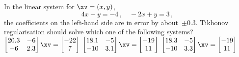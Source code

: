\begin{activity}
In the linear system for \(\xv=(x,y)\),
\begin{equation*}
4x-y=-4\,,\quad-2x+y=3\,,
\end{equation*}
the coefficients on the left-hand side are in error by about~\(\pm0.3\).  
Tikhonov regularisation should solve which one of the following systems?
{\(\begin{bmatrix} 20.3&-6\\-6&2.3 \end{bmatrix}\xv=\begin{bmatrix} -22\\7 \end{bmatrix}\)}
{\(\begin{bmatrix} 18.1&-5\\-10&3.1 \end{bmatrix}\xv=\begin{bmatrix} -19\\11 \end{bmatrix}\)}
{\(\begin{bmatrix} 18.3&-5\\-10&3.3 \end{bmatrix}\xv=\begin{bmatrix} -19\\11 \end{bmatrix}\)}

\end{activity}
